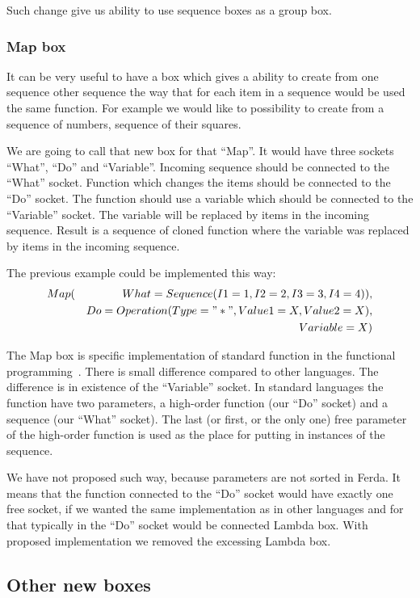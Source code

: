 \documentclass[a4paper,12pt]{book}
\begin{document}
Such change give us ability to use sequence boxes as a group box.

\subsubsection{Map box}
It can be very useful to have a box which gives a ability to create from one sequence other sequence the way that for each item in a sequence would be used the same function. For example we would like to possibility to create from a sequence of numbers, sequence of their squares. 

We are going to call that new box for that ``Map''. It would have three sockets ``What'', ``Do'' and ``Variable''. Incoming sequence should be connected to the ``What'' socket. Function which changes the items should be connected to the ``Do'' socket. The function should use a variable which should be connected to the ``Variable'' socket. The variable will be replaced by items in the incoming sequence. Result is a sequence of cloned function where the variable was replaced by items in the incoming sequence.

The previous example could be implemented this way:
\begin{eqnarray*}
Map(&&What=Sequence(I1=1,I2=2,I3=3,I4=4)), \\&& Do=Operation(Type="*", Value1=X, Value2=X), \\&& Variable=X)
\end{eqnarray*}

The Map box is specific implementation of standard function in the functional programming~\cite{WikiMap}. There is small difference compared to other languages. The difference is in existence of the ``Variable'' socket. In standard languages the function have two parameters, a high-order function (our ``Do'' socket) and a sequence (our ``What'' socket). The last (or first, or the only one) free parameter of the high-order function is used as the place for putting in instances of the sequence.

We have not proposed such way, because parameters are not sorted in Ferda. It means that the function connected to the ``Do'' socket would have exactly one free socket, if we wanted the same implementation as in other languages and for that typically in the ``Do'' socket would be connected Lambda box. With proposed implementation we removed the excessing Lambda box.

\subsection{Other new boxes}
\end{document}
